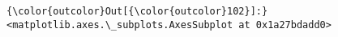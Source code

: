 \documentclass[11pt]{article}
\begin{document}
\begin{Verbatim}[commandchars=\\\{\}]
{\color{outcolor}Out[{\color{outcolor}102}]:} <matplotlib.axes.\_subplots.AxesSubplot at 0x1a27bdadd0>
\end{Verbatim}
            
    \begin{center}
    \end{center}
    { \hspace*{\fill} \\}
    

    
    
    
    
\end{document}

